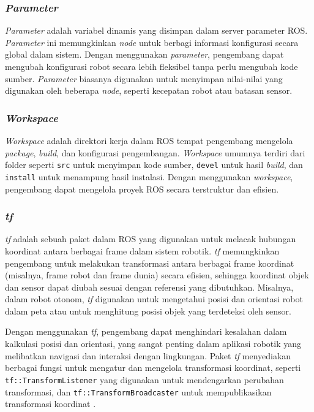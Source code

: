 \subsubsection{\emph{Parameter}}
\emph{Parameter} adalah variabel dinamis yang disimpan dalam server parameter ROS. \emph{Parameter} ini memungkinkan \emph{node} untuk berbagi informasi konfigurasi secara global dalam sistem. Dengan menggunakan \emph{parameter}, pengembang dapat mengubah konfigurasi robot secara lebih fleksibel tanpa perlu mengubah kode sumber. \emph{Parameter} biasanya digunakan untuk menyimpan nilai-nilai yang digunakan oleh beberapa \emph{node}, seperti kecepatan robot atau batasan sensor.

\subsubsection{\emph{Workspace}}
\emph{Workspace} adalah direktori kerja dalam ROS tempat pengembang mengelola \emph{package}, \emph{build}, dan konfigurasi pengembangan. \emph{Workspace} umumnya terdiri dari folder seperti \texttt{src} untuk menyimpan kode sumber, \texttt{devel} untuk hasil \emph{build}, dan \texttt{install} untuk menampung hasil instalasi. Dengan menggunakan \emph{workspace}, pengembang dapat mengelola proyek ROS secara terstruktur dan efisien.

\subsubsection{\emph{tf}}
\emph{tf} adalah sebuah paket dalam ROS yang digunakan untuk melacak hubungan koordinat antara berbagai frame dalam sistem robotik. \emph{tf} memungkinkan pengembang untuk melakukan transformasi antara berbagai frame koordinat (misalnya, frame robot dan frame dunia) secara efisien, sehingga koordinat objek dan sensor dapat diubah sesuai dengan referensi yang dibutuhkan. Misalnya, dalam robot otonom, \emph{tf} digunakan untuk mengetahui posisi dan orientasi robot dalam peta atau untuk menghitung posisi objek yang terdeteksi oleh sensor.

Dengan menggunakan \emph{tf}, pengembang dapat menghindari kesalahan dalam kalkulasi posisi dan orientasi, yang sangat penting dalam aplikasi robotik yang melibatkan navigasi dan interaksi dengan lingkungan. Paket \emph{tf} menyediakan berbagai fungsi untuk mengatur dan mengelola transformasi koordinat, seperti \texttt{tf::TransformListener} yang digunakan untuk mendengarkan perubahan transformasi, dan \texttt{tf::TransformBroadcaster} untuk mempublikasikan transformasi koordinat \cite{ros_noetic}.

